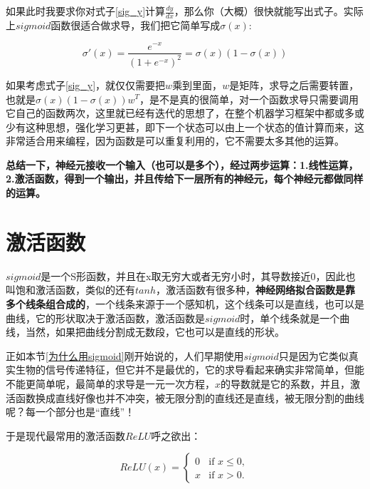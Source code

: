 \documentclass[a5paper, 11pt]{ctexbook}
\begin{document}
如果此时我要求你对式子\ref{sig_y}计算$\frac{dy}{dx}$，那么你（大概）很快就能写出式子。实际上$sigmoid$函数很适合做求导，我们把它简单写成$\sigma(x)$:

\begin{equation}
    \sigma'(x) = \frac{e^{-x}}{(1+e^{-x})^2}=\sigma(x)(1 - \sigma(x))
\end{equation}

如果考虑式子\ref{sig_y}，就仅仅需要把$w$乘到里面，$w$是矩阵，求导之后需要转置，也就是$\sigma(x)(1 - \sigma(x))w^T$，是不是真的很简单，对一个函数求导只需要调用它自己的函数两次，这里就已经有迭代的思想了，在整个机器学习框架中都或多或少有这种思想，强化学习更甚，即下一个状态可以由上一个状态的值计算而来，这非常适合用来编程，因为函数是可以重复利用的，它不需要太多其他的运算。

\textbf{总结一下，神经元接收一个输入（也可以是多个），经过两步运算：1.线性运算，2.激活函数，得到一个输出，并且传给下一层所有的神经元，每个神经元都做同样的运算。}

\section{激活函数}
$sigmoid$是一个S形函数，并且在x取无穷大或者无穷小时，其导数接近0，因此也叫饱和激活函数，类似的还有$tanh$，激活函数有很多种，\textbf{神经网络拟合函数是靠多个线条组合成的}，一个线条来源于一个感知机，这个线条可以是直线，也可以是曲线，它的形状取决于激活函数，激活函数是$sigmoid$时，单个线条就是一个曲线，当然，如果把曲线分割成无数段，它也可以是直线的形状。

正如本节\ref{为什么用sigmoid}刚开始说的，人们早期使用$sigmoid$只是因为它类似真实生物的信号传递特征，但它并不是最优的，它的求导看起来确实非常简单，但能不能更简单呢，最简单的求导是一元一次方程，$x$的导数就是它的系数，并且，激活函数换成直线好像也并不冲突，被无限分割的直线还是直线，被无限分割的曲线呢？每一个部分也是“直线”！

于是现代最常用的激活函数$ReLU$呼之欲出：

\begin{equation}
    \label{Relu函数}
    ReLU(x) =
    \begin{cases}
        0 & \text{if } x \le 0, \\
        x & \text{if } x > 0.
    \end{cases}
\end{equation}
\end{document}

